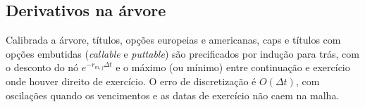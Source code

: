 \subsection{Derivativos na árvore}

Calibrada a árvore, títulos, opções europeias e americanas, caps e títulos com opções embutidas (\emph{callable} e \emph{puttable}) são precificados por indução para trás, com o desconto do nó $e^{-r_{m,j}\Delta t}$ e o máximo (ou mínimo) entre continuação e exercício onde houver direito de exercício. O erro de discretização é $O(\Delta t)$, com oscilações quando os vencimentos e as datas de exercício não caem na malha.
